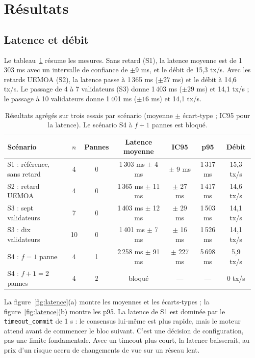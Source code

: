 \documentclass[conference]{IEEEtran}
\begin{document}
\section{Résultats}
\label{sec:resultats}

\subsection{Latence et débit}

Le tableau~\ref{tab:resultats} résume les mesures. Sans retard (S1), la latence moyenne est de 1\,303 ms avec un intervalle de confiance de $\pm 9$ ms, et le débit de 15,3 tx/s. Avec les retards UEMOA (S2), la latence passe à 1\,365 ms ($\pm 27$ ms) et le débit à 14,6 tx/s. Le passage de 4 à 7 validateurs (S3) donne 1\,403 ms ($\pm 29$ ms) et 14,1 tx/s ; le passage à 10 validateurs donne 1\,401 ms ($\pm 16$ ms) et 14,1 tx/s.

\begin{table}[t]
\caption{Résultats agrégés sur trois essais par scénario (moyenne $\pm$ écart-type ; IC95 pour la latence). Le scénario S4 à $f+1$ pannes est bloqué.}
\label{tab:resultats}
\centering
\footnotesize
\begin{tabular}{@{}lcccccc@{}}
\toprule
Scénario & $n$ & Pannes & Latence moyenne & IC95 & p95 & Débit \\
\midrule
S1 : référence, sans retard & 4 & 0 & 1\,303 ms $\pm$ 4 ms & $\pm$ 9 ms & 1\,317 ms & 15,3 tx/s \\
S2 : retard UEMOA & 4 & 0 & 1\,365 ms $\pm$ 11 ms & $\pm$ 27 ms & 1\,417 ms & 14,6 tx/s \\
S3 : sept validateurs & 7 & 0 & 1\,403 ms $\pm$ 12 ms & $\pm$ 29 ms & 1\,503 ms & 14,1 tx/s \\
S3 : dix validateurs & 10 & 0 & 1\,401 ms $\pm$ 7 ms & $\pm$ 16 ms & 1\,526 ms & 14,1 tx/s \\
S4 : $f=1$ panne & 4 & 1 & 2\,258 ms $\pm$ 91 ms & $\pm$ 227 ms & 5\,698 ms & 5,9 tx/s \\
S4 : $f+1=2$ pannes & 4 & 2 & bloqué & --- & --- & 0 tx/s \\
\bottomrule
\end{tabular}
\end{table}

La figure~\ref{fig:latence}(a) montre les moyennes et les écarts-types ; la figure~\ref{fig:latence}(b) montre les p95. La latence de S1 est dominée par le \texttt{timeout\_commit} de 1 s : le consensus lui-même est plus rapide, mais le moteur attend avant de commencer le bloc suivant. C'est une décision de configuration, pas une limite fondamentale. Avec un timeout plus court, la latence baisserait, au prix d'un risque accru de changements de vue sur un réseau lent.
\end{document}
